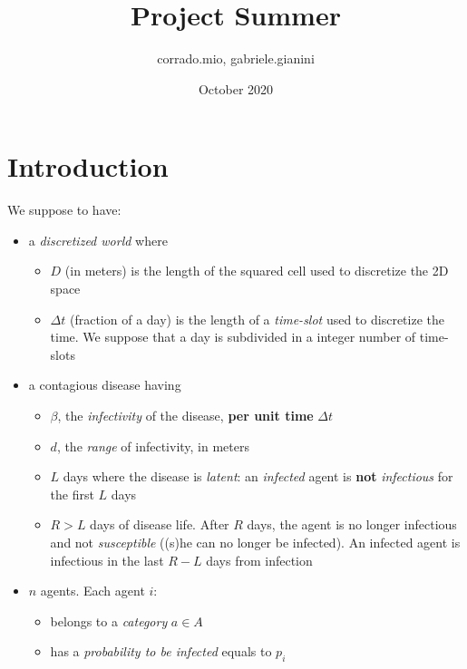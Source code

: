 \documentclass[12pt, a4paper]{article}
\title{Project Summer}
\author{corrado.mio, gabriele.gianini}
\date{October 2020}
\begin{document}
\setlength{\parindent}{0em}
\maketitle

\section{Introduction}

We suppose to have:

\begin{itemize}
    \item a \textit{discretized world} where
        \begin{itemize}
            \item $D$ (in meters) is the length of the squared cell used to discretize the 2D space
            \item $\Delta{t}$ (fraction of a day) is the length of a \textit{time-slot} used to discretize the time. We suppose that a day is subdivided in a integer number of time-slots 
        \end{itemize}
    
    \item a contagious disease having
        \begin{itemize}
            \item $\beta$, the \textit{infectivity} of the disease, {\bf per unit time} $\Delta{t}$
            \item $d$, the \textit{range} of infectivity, in meters
            \item $L$ days where the disease is \textit{latent}: an  \textit{infected} agent is \textbf{not} \textit{infectious} for the first $L$ days
            \item $R > L$ days of disease life. After $R$ days, the agent is no longer infectious and not \textit{susceptible} ((s)he can no longer be infected). An infected agent is infectious in the last $R-L$ days from infection
        \end{itemize}
    
    \item $n$ agents. Each agent $i$:
        \begin{itemize}
            \item belongs to a \textit{category} $a \in A$
            \item has a \textit{probability to be infected} equals to $p_i$
        \end{itemize}
    

\end{itemize}
\end{document}
